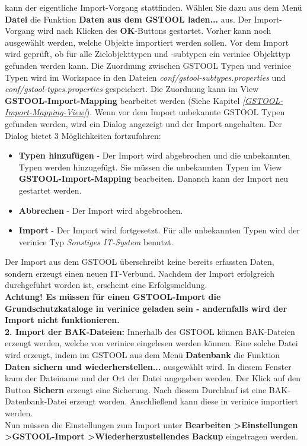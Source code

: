 \documentclass[a4paper,10pt]{book}
\begin{document}
kann der eigentliche Import-Vorgang stattfinden. Wählen Sie dazu aus dem Menü \textbf{Datei} die Funktion \textbf{Daten aus dem \textsc{GSTOOL} laden...} aus.
Der Import-Vorgang wird nach Klicken des \textbf{OK}-Buttons gestartet. Vorher kann noch ausgewählt werden, welche Objekte importiert werden sollen.
Vor dem Import wird geprüft, ob für alle Zielobjekttypen und -subtypen ein verinice Objekttyp gefunden werden kann. Die Zuordnung zwischen GSTOOL Typen und verinice
Typen wird im Workspace in den Dateien \textit{conf/gstool-subtypes.properties} und \textit{conf/gstool-types.properties} gespeichert. Die Zuordnung kann im View \textbf{GSTOOL-Import-Mapping} bearbeitet werden (Siehe Kapitel {\em \ref{GSTOOL-Import-Mapping-View}}). Wenn vor dem Import unbekannte GSTOOL Typen gefunden werden, wird ein Dialog angezeigt und der Import angehalten. Der Dialog bietet 3 Möglichkeiten fortzufahren:
\begin{itemize}
 \item \textbf{Typen hinzufügen} - Der Import wird abgebrochen und die unbekannten Typen werden hinzugefügt. Sie müssen die unbekannten Typen im View \textbf{GSTOOL-Import-Mapping} bearbeiten. Dananch kann der Import neu gestartet werden.
 \item \textbf{Abbrechen} - Der Import wird abgebrochen.
 \item \textbf{Import} - Der Import wird fortgesetzt. Für alle unbekannten Typen wird der verinice Typ \textit{Sonstiges IT-System} benutzt.
\end{itemize}

Der Import aus dem \textsc{GSTOOL} überschreibt keine bereits erfassten Daten, sondern erzeugt einen neuen IT-Verbund. Nachdem der Import erfolgreich
durchgeführt worden ist, erscheint eine Erfolgsmeldung.
\newline\\
\textbf{Achtung! Es müssen für einen \textsc{GSTOOL}-Import die Grundschutzkataloge in verinice geladen sein - andernfalls wird der Import nicht funktionieren.}
\newline\\
\textbf{2. Import der BAK-Dateien:}
Innerhalb des \textsc{GSTOOL} können BAK-Dateien erzeugt werden, welche von verinice eingelesen werden können.
Eine solche Datei wird erzeugt, indem im \textsc{GSTOOL} aus dem Menü
\textbf{Datenbank} die Funktion \textbf{Daten sichern und wiederherstellen...} ausgewählt wird. In diesem Fenster kann der Dateiname und der Ort der Datei angegeben werden. Der Klick auf
den Button \textbf{Sichern} erzeugt eine Sicherung. Nach diesem Durchlauf ist eine BAK-Datenbank-Datei erzeugt worden. Anschließend kann diese in verinice importiert werden.
\newline\\
Nun müssen die Einstellungen zum Import unter \textbf{Bearbeiten \textgreater Einstellungen \textgreater \textsc{GSTOOL}-Import \textgreater Wiederherzustellendes Backup} eingetragen werden.
\end{document}
